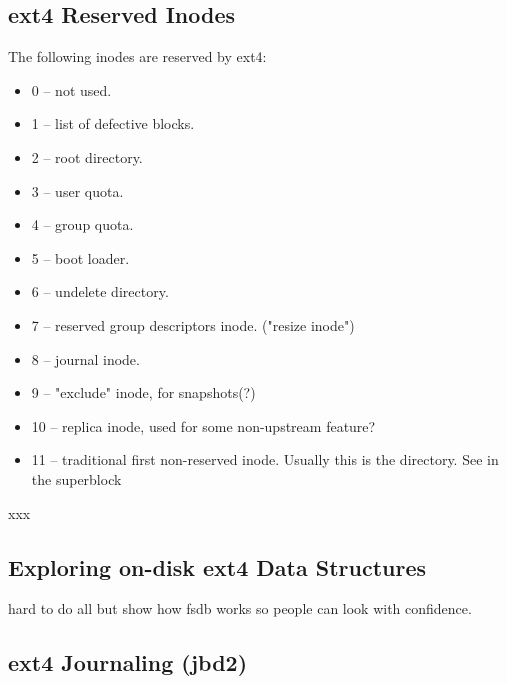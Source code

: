 \subsection{ext4 Reserved Inodes}

The following inodes are reserved by ext4:

\begin{itemize}
	\setcounter{enumi}{-1}
	\item 0 -- not used.
	\item 1 -- list of defective blocks.
	\item 2 -- root directory.
	\item 3 -- user quota.
	\item 4 -- group quota.
	\item 5 -- boot loader.
	\item 6 -- undelete directory.
	\item 7 -- reserved group descriptors inode. ("resize inode")
	\item 8 -- journal inode.
	\item 9 -- "exclude" inode, for snapshots(?)
	\item 10 -- replica inode, used for some non-upstream feature?
	\item 11 -- traditional first non-reserved inode. Usually this is the  directory. See in the superblock
\end{itemize}

\noindent
xxx


\subsection{Exploring on-disk ext4 Data Structures}

hard to do all but show how fsdb works so people can look with confidence.


\subsection{ext4 Journaling (jbd2)}


